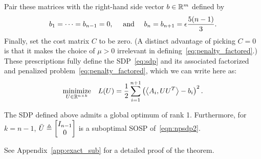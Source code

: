 Pair these matrices with the right-hand side vector $b \in \mathbb{R}^m$ defined by
\begin{align*}
	b_1 = \cdots = b_{n-1} = 0, \quad \textrm{ and } \quad  b_{n} = b_{n+1} = \epsilon \frac{5(n-1)}{3}.
\end{align*}
Finally, set the cost matrix $C$ to be zero. (A distinct advantage of picking $C = 0$ is that it makes the choice of $\mu > 0$ irrelevant in defining~\eqref{eq:penalty_factored}.) These prescriptions fully define the SDP~\eqref{eq:sdp} and its associated factorized and penalized problem~\eqref{eq:penalty_factored}, which we can write here as:
\begin{align}
	\underset{U \in \mathbb{R}^{n\times k}}{\operatorname*{\mathrm{minimize}}} \quad L(U) = \frac{1}{2} \sum_{i=1}^{n+1} \left(\left\langle A_i, UU^T \right\rangle - b_i\right)^2. \label{eqn:npsdp2}
\end{align}
\begin{theorem}\label{thm:bad_sdp}
	The SDP defined above admits a global optimum of rank 1. Furthermore, for $k = n-1$, $\bar U \triangleq \begin{bmatrix}I_{n-1} \\ 0 \end{bmatrix}$ is a suboptimal SOSP of~\eqref{eqn:npsdp2}.
\end{theorem}
See Appendix~\ref{app:exact_sub} for a detailed proof of the theorem. 